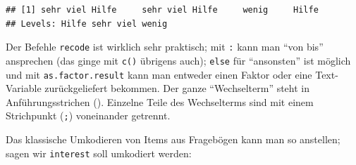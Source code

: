 \documentclass[12pt,ngerman,paper=a4,pagesize,DIV=13]{scrreprt}
\newenvironment{Shaded}{\begin{snugshade}}{\end{snugshade}}
\newcommand{\DataTypeTok}[1]{\textcolor[rgb]{0.13,0.29,0.53}{#1}}
\newcommand{\KeywordTok}[1]{\textcolor[rgb]{0.13,0.29,0.53}{\textbf{#1}}}
\newcommand{\NormalTok}[1]{#1}
\newcommand{\OperatorTok}[1]{\textcolor[rgb]{0.81,0.36,0.00}{\textbf{#1}}}
\newcommand{\OtherTok}[1]{\textcolor[rgb]{0.56,0.35,0.01}{#1}}
\newcommand{\StringTok}[1]{\textcolor[rgb]{0.31,0.60,0.02}{#1}}
\begin{document}
\begin{Shaded}
\end{Shaded}

\begin{verbatim}
## [1] sehr viel Hilfe     sehr viel Hilfe     wenig     Hilfe    
## Levels: Hilfe sehr viel wenig
\end{verbatim}

Der Befehle \texttt{recode} ist wirklich sehr praktisch; mit \texttt{:}
kann man \enquote{von bis} ansprechen (das ginge mit \texttt{c()}
übrigens auch); \texttt{else} für \enquote{ansonsten} ist möglich und
mit \texttt{as.factor.result} kann man entweder einen Faktor oder eine
Text-Variable zurückgeliefert bekommen. Der ganze \enquote{Wechselterm}
steht in Anführungsstrichen (\texttt{\textquotesingle{}}). Einzelne
Teile des Wechselterms sind mit einem Strichpunkt (\texttt{;})
voneinander getrennt.

Das klassische Umkodieren von Items aus Fragebögen kann man so
anstellen; sagen wir \texttt{interest} soll umkodiert werden:

\begin{Shaded}
\end{Shaded}
\end{document}
